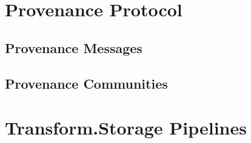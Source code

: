 \documentclass[9pt, oneside]{article}   	%
\begin{document}
\begin{multicols}{2}
\section{Provenance Protocol}\label{provprotocol}

\subsection{Provenance Messages}\label{provMessages}

\subsection{Provenance Communities}\label{provCommunities}

\section{Transform.Storage Pipelines}\label{transformpipes}



{}


\end{multicols}
\end{document}
